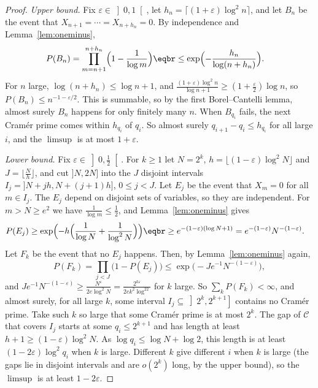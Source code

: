 \begin{proof}
\emph{Upper bound.} Fix $\varepsilon\in\left]0,1\right[$, let $h_n=\lceil(1+\varepsilon)\log^2n\rceil$, and let $B_n$ be the event that $X_{n+1}=\cdots=X_{n+h_n}=0$. By independence and
Lemma~\ref{lem:oneminus},
\[
\begin{aligned}P(B_n)&=\prod_{m=n+1}^{n+h_n}\Bigl(1-\frac1{\log m}\Bigr)\eqbr\le\exp\Bigl(-\frac{h_n}{\log(n+h_n)}\Bigr).\end{aligned}
\]
For $n$ large, $\log(n+h_n)\le\log n+1$, and $\frac{(1+\varepsilon)\log^2n}{\log n+1}\ge(1+\frac\varepsilon2)\log n$, so $P(B_n)\le n^{-1-\varepsilon/2}$. This is summable, so by the first Borel--Cantelli lemma,
almost surely $B_n$ happens for only finitely many $n$. When $B_{q_i}$ fails, the next Cramér prime comes within $h_{q_i}$ of $q_i$. So almost surely $q_{i+1}-q_i\le h_{q_i}$ for all large $i$, and the
$\limsup$ is at most $1+\varepsilon$.

\emph{Lower bound.} Fix $\varepsilon\in\left]0,\frac12\right[$. For $k\ge1$ let $N=2^k$, $h=\lfloor(1-\varepsilon)\log^2N\rfloor$ and $J=\lfloor\frac Nh\rfloor$, and cut $]N,2N]$ into the $J$ disjoint intervals
$I_j=]N+jh,N+(j+1)h]$, $0\le j<J$. Let $E_j$ be the event that $X_m=0$ for all $m\in I_j$. The $E_j$ depend on disjoint sets of variables, so they are independent. For $m>N\ge e^2$ we have
$\frac1{\log m}\le\frac12$, and Lemma~\ref{lem:oneminus} gives
\[
\begin{aligned}P(E_j)&\ge\exp\Bigl(-h\Bigl(\frac1{\log N}+\frac1{\log^2N}\Bigr)\Bigr)\eqbr\ge e^{-(1-\varepsilon)(\log N+1)}=e^{-(1-\varepsilon)}N^{-(1-\varepsilon)}.\end{aligned}
\]
Let $F_k$ be the event that no $E_j$ happens. Then, by Lemma~\ref{lem:oneminus} again,
\[
P(F_k)=\prod_{j<J}\bigl(1-P(E_j)\bigr)\le\exp\bigl(-Je^{-1}N^{-(1-\varepsilon)}\bigr),
\]
and $Je^{-1}N^{-(1-\varepsilon)}\ge\frac{N^\varepsilon}{2e\log^2N}=\frac{2^{k\varepsilon}}{2ek^2\log^22}$ for $k$ large. So $\sum_kP(F_k)<\infty$, and almost surely, for all large $k$, some interval $I_j\subseteq\left]2^k,2^{k+1}\right]$
contains no Cramér prime. Take such $k$ so large that some Cramér prime is at most $2^k$. The gap of $\mathcal C$ that covers $I_j$ starts at some $q_i\le2^{k+1}$ and has length at least $h+1\ge(1-\varepsilon)\log^2N$.
As $\log q_i\le\log N+\log2$, this length is at least $(1-2\varepsilon)\log^2q_i$ when $k$ is large. Different $k$ give different $i$ when $k$ is large (the gaps lie in disjoint intervals and are $o(2^k)$ long, by the upper bound),
so the $\limsup$ is at least $1-2\varepsilon$.
\end{proof}

